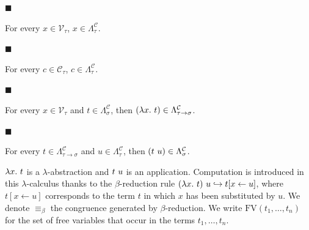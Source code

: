 \documentclass[10pt,a4paper]{article}
\begin{document}
\par\noindent  $\blacksquare$ 
 
For every $x\in\mathcal{V}_{\tau}$, $x\in\Lambda^{\mathcal{C}}_{\tau}$.\par
 
 
 
\par\noindent  $\blacksquare$ 
 
For every $c\in\mathcal{C}_{\tau}$, $c\in\Lambda^{\mathcal{C}}_{\tau}$.\par
 
 
 
\par\noindent  $\blacksquare$ 
 
For every $x\in\mathcal{V}_{\tau}$ and $t\in\Lambda^{\mathcal{C}}_{\sigma}$, then $(\lambda x.\leavevmode\nobreak\ t)\in\Lambda^{\mathcal{C}}_{\tau\rightarrow\sigma}$.\par
 
 
 
\par\noindent  $\blacksquare$ 
 
For every $t\in\Lambda^{\mathcal{C}}_{\tau\rightarrow\sigma}$ and $u\in\Lambda^{\mathcal{C}}_{\tau}$, then $(t\leavevmode\nobreak\ u)\in\Lambda^{\mathcal{C}}_{\sigma}$.\par
 
 
  
$\lambda x.\leavevmode\nobreak\ t$ is a $\lambda$-abstraction and $t\leavevmode\nobreak\ u$ is an application. Computation is introduced in this $\lambda$-calculus thanks to the $\beta$-reduction rule $(\lambda x.\leavevmode\nobreak\ t)\leavevmode\nobreak\ u\hookrightarrow t[x\leftarrow u]$, where $t[x\leftarrow u]$ corresponds to the term $t$ in which $x$ has been substituted by $u$. We denote $\equiv_{\beta}$ the congruence generated by $\beta$-reduction. We write $\text{{FV}}(t_{1},\ldots,t_{n})$ for the set of free variables that occur in the terms $t_{1},\ldots,t_{n}$.\par
 
 
 
\end{document}
